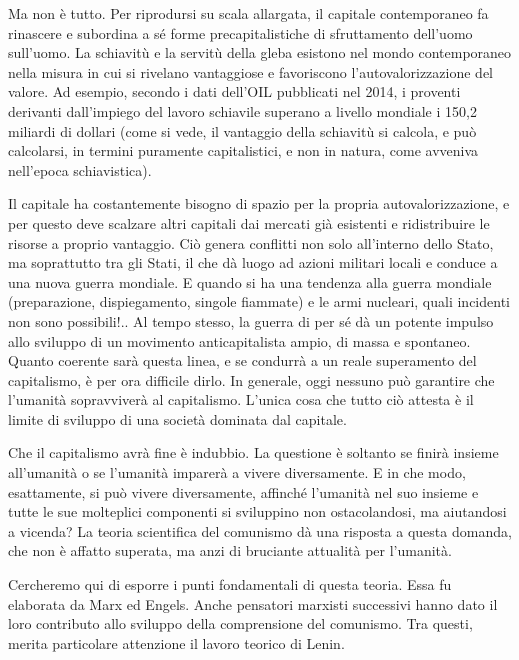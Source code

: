 \documentclass[../main]{subfiles}
\begin{document}
Ma non è tutto. Per riprodursi su scala allargata, il capitale contemporaneo fa rinascere e subordina a sé forme precapitalistiche di sfruttamento dell'uomo sull'uomo. La schiavitù e la servitù della gleba esistono nel mondo contemporaneo nella misura in cui si rivelano vantaggiose e favoriscono l'autovalorizzazione del valore. Ad esempio, secondo i dati dell'OIL pubblicati nel 2014, i proventi derivanti dall'impiego del lavoro schiavile superano a livello mondiale i 150,2 miliardi di dollari (come si vede, il vantaggio della schiavitù si calcola, e può calcolarsi, in termini puramente capitalistici, e non in natura, come avveniva nell'epoca schiavistica).

Il capitale ha costantemente bisogno di spazio per la propria autovalorizzazione, e per questo deve scalzare altri capitali dai mercati già esistenti e ridistribuire le risorse a proprio vantaggio. Ciò genera conflitti non solo all'interno dello Stato, ma soprattutto tra gli Stati, il che dà luogo ad azioni militari locali e conduce a una nuova guerra mondiale. E quando si ha una tendenza alla guerra mondiale (preparazione, dispiegamento, singole fiammate) e le armi nucleari, quali incidenti non sono possibili!.. Al tempo stesso, la guerra di per sé dà un potente impulso allo sviluppo di un movimento anticapitalista ampio, di massa e spontaneo. Quanto coerente sarà questa linea, e se condurrà a un reale superamento del capitalismo, è per ora difficile dirlo. In generale, oggi nessuno può garantire che l'umanità sopravviverà al capitalismo. L'unica cosa che tutto ciò attesta è il limite di sviluppo di una società dominata dal capitale.

Che il capitalismo avrà fine è indubbio. La questione è soltanto se finirà insieme all'umanità o se l'umanità imparerà a vivere diversamente. E in che modo, esattamente, si può vivere diversamente, affinché l'umanità nel suo insieme e tutte le sue molteplici componenti si sviluppino non ostacolandosi, ma aiutandosi a vicenda? La teoria scientifica del comunismo dà una risposta a questa domanda, che non è affatto superata, ma anzi di bruciante attualità per l'umanità.

Cercheremo qui di esporre i punti fondamentali di questa teoria. Essa fu elaborata da Marx ed Engels. Anche pensatori marxisti successivi hanno dato il loro contributo allo sviluppo della comprensione del comunismo. Tra questi, merita particolare attenzione il lavoro teorico di Lenin.
\end{document}
